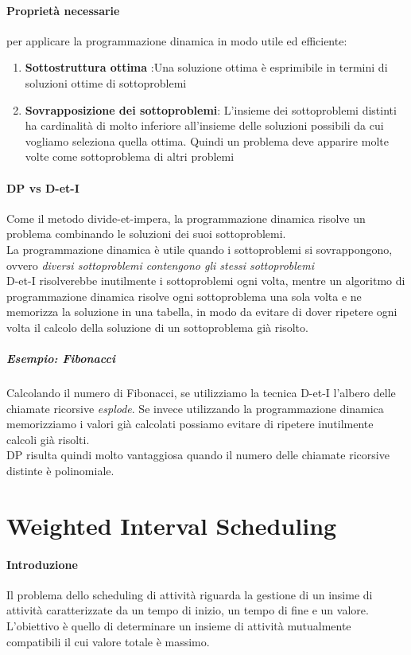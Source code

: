 \paragraph{Proprietà necessarie} per applicare la programmazione dinamica in modo utile ed efficiente:
\begin{enumerate}
	\item \textbf{Sottostruttura ottima} :Una soluzione ottima è esprimibile in termini di soluzioni ottime di sottoproblemi
	\item \textbf{Sovrapposizione dei sottoproblemi}: L'insieme dei sottoproblemi distinti ha cardinalità di molto inferiore all'insieme delle soluzioni possibili da cui vogliamo seleziona quella ottima. Quindi un problema deve apparire molte volte come sottoproblema di altri problemi
\end{enumerate}

\paragraph{DP vs D-et-I}
Come il metodo divide-et-impera, la programmazione dinamica risolve un problema combinando le soluzioni dei suoi sottoproblemi.\\
La programmazione dinamica è utile quando i sottoproblemi si sovrappongono, ovvero \emph{diversi sottoproblemi contengono gli stessi sottoproblemi}\\
D-et-I risolverebbe inutilmente i sottoproblemi ogni volta, mentre un algoritmo di programmazione dinamica risolve ogni sottoproblema una sola volta e ne memorizza la soluzione in una tabella, in modo da evitare di dover ripetere ogni volta il calcolo della soluzione di un sottoproblema già risolto.
\subparagraph{Esempio: Fibonacci}
Calcolando il numero di Fibonacci, se utilizziamo la tecnica D-et-I l'albero delle chiamate ricorsive \emph{esplode}.
Se invece utilizzando la programmazione dinamica memorizziamo i valori già calcolati possiamo evitare di ripetere inutilmente calcoli già risolti.\\
DP risulta quindi molto vantaggiosa quando il numero delle chiamate
ricorsive distinte è polinomiale.

\section{Weighted Interval Scheduling}
\paragraph{Introduzione}Il problema dello scheduling di attività riguarda la gestione di un insime di attività caratterizzate da un tempo di inizio, un tempo di fine e un valore.
L'obiettivo è quello di determinare un insieme di attività mutualmente compatibili il cui valore totale è massimo.

